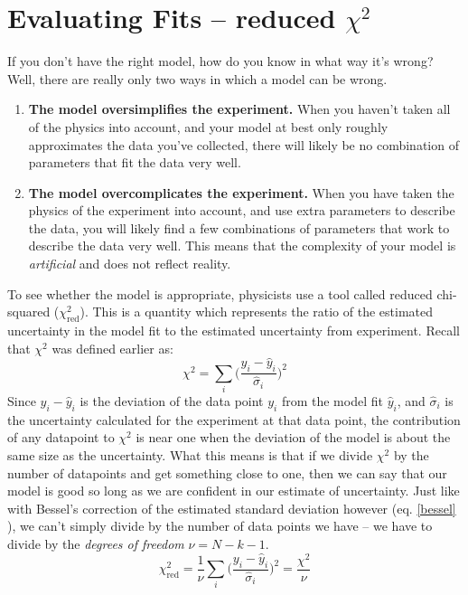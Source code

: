 \section{Evaluating Fits -- reduced $\chi^2$}
If you don't have the right model, how do you know in what way it's wrong? Well, there are really only two ways in which a model can be wrong.
\begin{enumerate}
\item {\bf The model oversimplifies the experiment.} When you haven't taken all of the physics into account, and your model at best only roughly approximates the data you've collected, there will likely be no combination of parameters that fit the data very well. 
\item {\bf The model overcomplicates the experiment.} When you have taken the physics of the experiment into account, and use extra parameters to describe the data, you will likely find a few combinations of parameters that work to describe the data very well. This means that the complexity of your model is {\it artificial} and does not reflect reality.
\end{enumerate}
To see whether the model is appropriate, physicists use a tool called reduced chi-squared ($\chi^2_{\text{red}}$). This is a quantity which represents the ratio of the estimated uncertainty in the model fit to the estimated uncertainty from experiment. Recall that $\chi^2$ was defined earlier as:
\begin{equation}
\chi^2= \sum_i \bigg (\frac{y_i - \hat y_i}{\hat \sigma_i} \bigg )^2
\end{equation}
Since $y_i - \hat y_i$ is the deviation of the data point $y_i$ from the model fit $\hat y_i$, and $\hat \sigma_i$ is the uncertainty calculated for the experiment at that data point, the contribution of any datapoint to $\chi^2$ is near one when the deviation of the model is about the same size as the uncertainty. What this means is that if we divide $\chi^2$ by the number of datapoints and get something close to one, then we can say that our model is good so long as we are confident in our estimate of uncertainty. Just like with Bessel's correction of the estimated standard deviation however (eq. \ref{bessel} ), we can't simply divide by the number of data points we have -- we have to divide by the \emph{degrees of freedom} $\nu = N - k - 1$.
\begin{equation}
\chi^2_{\text{red}} =   \frac{1}{\nu} \sum_i \bigg (\frac{y_i - \hat y_i}{\hat \sigma_i} \bigg )^2 = \frac{\chi^2 }{\nu}
\end{equation}
